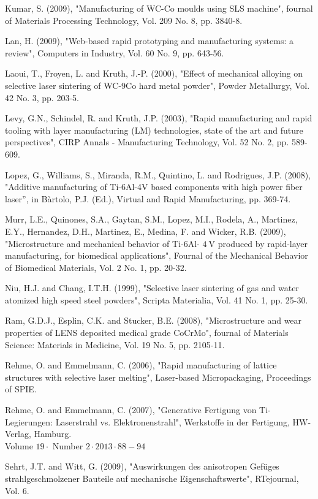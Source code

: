 \documentclass[10pt]{article}
\begin{document}
Kumar, S. (2009), "Manufacturing of WC-Co moulds using SLS machine", fournal of Materials Processing Technology, Vol. 209 No. 8, pp. 3840-8.

Lan, H. (2009), "Web-based rapid prototyping and manufacturing systems: a review", Computers in Industry, Vol. 60 No. 9, pp. 643-56.

Laoui, T., Froyen, L. and Kruth, J.-P. (2000), "Effect of mechanical alloying on selective laser sintering of WC-9Co hard metal powder", Powder Metallurgy, Vol. 42 No. 3, pp. 203-5.

Levy, G.N., Schindel, R. and Kruth, J.P. (2003), "Rapid manufacturing and rapid tooling with layer manufacturing (LM) technologies, state of the art and future perspectives", CIRP Annals - Manufacturing Technology, Vol. 52 No. 2, pp. 589-609.

Lopez, G., Williams, S., Miranda, R.M., Quintino, L. and Rodrigues, J.P. (2008), "Additive manufacturing of Ti-6Al-4V based components with high power fiber laser”, in Bàrtolo, P.J. (Ed.), Virtual and Rapid Manufacturing, pp. 369-74.

Murr, L.E., Quinones, S.A., Gaytan, S.M., Lopez, M.I., Rodela, A., Martinez, E.Y., Hernandez, D.H., Martinez, E., Medina, F. and Wicker, R.B. (2009), "Microstructure and mechanical behavior of Ti-6Al- $4 \mathrm{~V}$ produced by rapid-layer manufacturing, for biomedical applications", Fournal of the Mechanical Behavior of Biomedical Materials, Vol. 2 No. 1, pp. 20-32.

Niu, H.J. and Chang, I.T.H. (1999), "Selective laser sintering of gas and water atomized high speed steel powders", Scripta Materialia, Vol. 41 No. 1, pp. 25-30.

Ram, G.D.J., Esplin, C.K. and Stucker, B.E. (2008), "Microstructure and wear properties of LENS deposited medical grade CoCrMo", fournal of Materials Science: Materials in Medicine, Vol. 19 No. 5, pp. 2105-11.

Rehme, O. and Emmelmann, C. (2006), "Rapid manufacturing of lattice structures with selective laser melting", Laser-based Micropackaging, Proceedings of SPIE.

Rehme, O. and Emmelmann, C. (2007), "Generative Fertigung von Ti-Legierungen: Laserstrahl vs. Elektronenstrahl", Werkstoffe in der Fertigung, HW-Verlag, Hamburg.\\
Volume $19 \cdot$ Number $2 \cdot 2013 \cdot 88-94$

Sehrt, J.T. and Witt, G. (2009), "Auswirkungen des anisotropen Gefüges strahlgeschmolzener Bauteile auf mechanische Eigenschaftswerte", RTejournal, Vol. 6.
\end{document}
